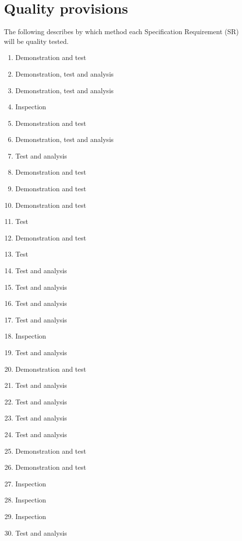 \documentclass[Main]{subfiles}
\begin{document}
\chapter{Quality provisions}
The following describes by which method each Specification Requirement (SR) will be quality tested.

\begin{enumerate}[{SR}-1:]
\setcounter{enumi}{0}
\item Demonstration and test
\item Demonstration, test and analysis
\item Demonstration, test and analysis

\item Inspection
\item Demonstration and test
\item Demonstration, test and analysis
\item Test and analysis

\item Demonstration and test
\item Demonstration and test
\item Demonstration and test
\item Test

\item Demonstration and test 
\item Test

\item Test and analysis
\item Test and analysis
\item Test and analysis

\item Test and analysis

\item Inspection 
\item Test and analysis
\item Demonstration and test

\item Test and analysis

\item Test and analysis
\item Test and analysis
\item Test and analysis

\item Demonstration and test
\item Demonstration and test

\item Inspection
\item Inspection
\item Inspection
\item Test and analysis

\end{enumerate}
\end{document}
